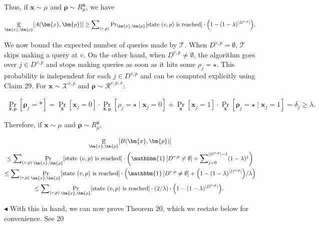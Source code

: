 \documentclass[10pt,a4paper]{article}
\begin{document}
Thus, if $\bm{x}\sim\mu$ and $\bm{\rho}\sim R_{\mu}^{\bm{x}}$, we have\par


\[\begin{gathered}
\mathop{\mathbb{E}}_{\bm{x},\bm{\rho}}[A(\bm{x},\bm{\rho})]\geq\sum\nolimits_{(v,p)}\Pr\nolimits_{\bm{x},\bm{\rho}}[\text{state $(v,p)$ is reached}]\cdot\Big{(}1-(1-\lambda)^{|D^{v,p}|}\Big{)}.
\end{gathered}\]


We now bound the expected number of queries made by $\mathcal{T}$. When $D^{v,p}=\emptyset$, $\mathcal{T}$ skips making a query at $v$. On the other hand, when $D^{v,p}\neq\emptyset$, the algorithm goes over $j\in D^{v,p}$ and stops making queries as soon as it hits some $\rho_{j}=\star$. This probability is independent for each $j\in D^{v,p}$ and can be computed explicitly using Claim 29. For $\bm{x}\sim\mathcal{X}^{v,p}$ and $\bm{\rho}\sim\mathcal{R}^{v,p,x}$:\par


\[\begin{gathered}
\Pr_{\bm{x},\bm{\rho}}[\bm{\rho}_{j}=*]=\Pr_{\bm{x}}[\bm{x}_{j}=0]\cdot\Pr_{\bm{x},\bm{\rho}}[\rho_{j}=\star\mid\bm{x}_{j}=0]+\Pr_{\bm{x}}[\bm{x}_{j}=1]\cdot\Pr_{\bm{x}}[\bm{\rho}_{j}=\star\mid\bm{x}_{j}=1]=\delta_{j}\geq\lambda.
\end{gathered}\]


Therefore, if $\bm{x}\sim\mu$ and $\bm{\rho}\sim R_{\mu}^{\bm{x}}$,\par


\[\begin{gathered}
\displaystyle\mathop{\mathbb{E}}_{\bm{x},\bm{\rho}}[B(\bm{x},\bm{\rho})] \\
\displaystyle\leq \displaystyle\sum\nolimits_{(v,p)}\Pr_{\bm{x},\bm{\rho}}[\text{state $(v,p)$ is reached}]\cdot\left(\mathbbm{1}\left[D^{v,p}\neq\emptyset\right]+\sum\nolimits_{j=0}^{|D^{v,p}|-1}(1-\lambda)^{j}\right) \\
\displaystyle\leq \displaystyle\sum\nolimits_{(v,p)}\Pr_{\bm{x},\bm{\rho}}[\text{state $(v,p)$ is reached}]\cdot\left(\mathbbm{1}\left[D^{v,p}\neq\emptyset\right]+\Big{(}1-(1-\lambda)^{|D^{v,p}|}\Big{)}/\lambda\right) \\
\displaystyle\leq \displaystyle\sum\nolimits_{(v,p)}\Pr_{\bm{x},\bm{\rho}}[\text{state $(v,p)$ is reached}]\cdot\left(2/\lambda\right)\cdot\Big{(}1-(1-\lambda)^{|D^{v,p}|}\Big{)}.\
\end{gathered}\]


$\blacktriangleleft$
With this in hand, we can now prove Theorem 20, which we restate below for convenience.
See 20\par
\end{document}
